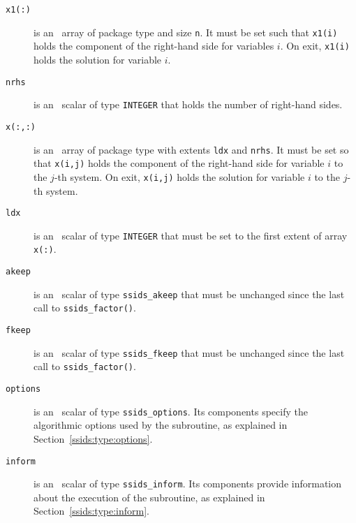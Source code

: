 \begin{description}
\item[\texttt{x1(:)}] is an \intentinout\ array of package type and size
\texttt{n}. It must be set such that \texttt{x1(i)} holds the component of
the right-hand side for variables $i$. On exit, \texttt{x1(i)} holds the
solution for variable $i$.

\item[\texttt{nrhs}] is an \intentin\ scalar of type {\tt INTEGER} that holds
the number of right-hand sides.

\item[\texttt{x(:,:)}] is an \intentinout\ array of package type with extents
\texttt{ldx} and \texttt{nrhs}. It must be set so that \texttt{x(i,j)} holds the
component of the right-hand side for variable $i$ to the $j$-th
system. On exit, \texttt{x(i,j)} holds the solution for variable $i$ to
the $j$-th system.

\item[\texttt{ldx}] is an \intentin\ scalar of type {\tt INTEGER} that must be
   set to the first extent of array \texttt{x(:)}.

\item[\texttt{akeep}]  is an \intentin\ scalar of type {\tt ssids\_akeep} that
must be unchanged since the last call to {\tt ssids\_factor()}.

\item[\texttt{fkeep}]  is an \intentin\ scalar of type {\tt ssids\_fkeep} that
must be unchanged since the last call to {\tt ssids\_factor()}.

\item[\texttt{options}] is an \intentin\ scalar of type {\tt ssids\_options}.
Its components specify the algorithmic options used by the subroutine, as
explained in Section~\ref{ssids:type:options}.

\item[\texttt{inform}] is an \intentout\ scalar of type
{\tt ssids\_inform}. Its components provide information about the execution
of the subroutine, as explained in Section~\ref{ssids:type:inform}.


\end{description}
